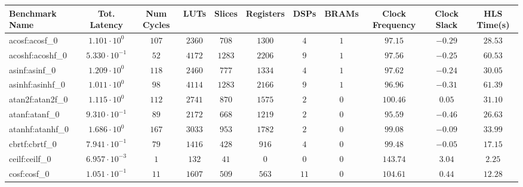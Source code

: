 \begin{tabular}{|l|c|c|c|c|c|c|c|c|c|c|}
\hline
Benchmark Name               & Tot. Latency            & Num Cycles & LUTs      & Slices    & Registers & DSPs    & BRAMs & Clock Frequency & Clock Slack & HLS Time(s) \\
\hline
acosf:acosf\_0               & $ 1.101 \cdot 10^{0}  $ & $ 107    $ & $ 2360  $ & $ 708   $ & $ 1300  $ & $ 4   $ & $ 1 $ & $ 97.15       $ & $ -0.29   $ & $ 28.53   $ \\
acoshf:acoshf\_0             & $ 5.330 \cdot 10^{-1} $ & $ 52     $ & $ 4172  $ & $ 1283  $ & $ 2206  $ & $ 9   $ & $ 1 $ & $ 97.56       $ & $ -0.25   $ & $ 60.53   $ \\
asinf:asinf\_0               & $ 1.209 \cdot 10^{0}  $ & $ 118    $ & $ 2460  $ & $ 777   $ & $ 1334  $ & $ 4   $ & $ 1 $ & $ 97.62       $ & $ -0.24   $ & $ 30.05   $ \\
asinhf:asinhf\_0             & $ 1.011 \cdot 10^{0}  $ & $ 98     $ & $ 4114  $ & $ 1283  $ & $ 2166  $ & $ 9   $ & $ 1 $ & $ 96.96       $ & $ -0.31   $ & $ 61.39   $ \\
atan2f:atan2f\_0             & $ 1.115 \cdot 10^{0}  $ & $ 112    $ & $ 2741  $ & $ 870   $ & $ 1575  $ & $ 2   $ & $ 0 $ & $ 100.46      $ & $ 0.05    $ & $ 31.10   $ \\
atanf:atanf\_0               & $ 9.310 \cdot 10^{-1} $ & $ 89     $ & $ 2172  $ & $ 668   $ & $ 1219  $ & $ 2   $ & $ 0 $ & $ 95.59       $ & $ -0.46   $ & $ 26.63   $ \\
atanhf:atanhf\_0             & $ 1.686 \cdot 10^{0}  $ & $ 167    $ & $ 3033  $ & $ 953   $ & $ 1782  $ & $ 2   $ & $ 0 $ & $ 99.08       $ & $ -0.09   $ & $ 33.99   $ \\
cbrtf:cbrtf\_0               & $ 7.941 \cdot 10^{-1} $ & $ 79     $ & $ 1416  $ & $ 428   $ & $ 916   $ & $ 4   $ & $ 0 $ & $ 99.48       $ & $ -0.05   $ & $ 17.15   $ \\
ceilf:ceilf\_0               & $ 6.957 \cdot 10^{-3} $ & $ 1      $ & $ 132   $ & $ 41    $ & $ 0     $ & $ 0   $ & $ 0 $ & $ 143.74      $ & $ 3.04    $ & $ 2.25    $ \\
cosf:cosf\_0                 & $ 1.051 \cdot 10^{-1} $ & $ 11     $ & $ 1607  $ & $ 509   $ & $ 563   $ & $ 11  $ & $ 0 $ & $ 104.61      $ & $ 0.44    $ & $ 12.28   $ \\

\end{tabular}
